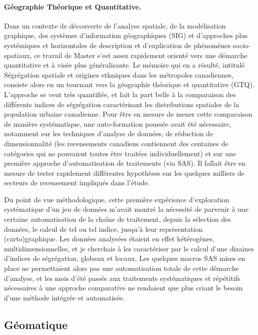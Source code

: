 \paragraph{Géographie Théorique et Quantitative.}

Dans un contexte de découverte de l'analyse spatiale, de la modélisation graphique, des systèmes d'information géographiques (SIG) et d'approches plus systémiques et horizontales de description et d'explication de phénomènes socio-spatiaux, ce travail de Master s'est assez rapidement orienté vers une démarche quantitative et à visée plus généralisante.
Le mémoire qui en a résulté, intitulé \og Ségrégation spatiale et origines ethniques dans les métropoles canadiennes\fg{}, consiste alors en un tournant vers la géographie théorique et quantitative (GTQ).
L'approche se veut très quantifiée, et fait la part belle à la comparaison des différents indices de ségrégation caractérisant les distributions spatiales de la population urbaine canadienne.
Pour être en mesure de mener cette comparaison de manière systématique, une auto-formation poussée avait été nécessaire, notamment sur les techniques d'analyse de données, de réduction de dimensionnalité (les recensements canadiens contiennent des centaines de catégories qui ne pouvaient toutes être traitées individuellement) et sur une première approche d'automatisation de traitements (via SAS).
Il fallait être en mesure de tester rapidement différentes hypothèses sur les quelques milliers de \og secteurs de recensement\fg{} impliqués dans l'étude.

Du point de vue méthodologique, cette première expérience d'exploration systématique d'un jeu de données m'avait montré la nécessité de parvenir à une certaine automatisation de la chaîne de traitement, depuis la sélection des données, le calcul de tel ou tel indice, jusqu'à leur représentation (carto)graphique.
Les données analysées étaient en effet hétérogènes, multidimensionnelles, et je cherchais à les caractériser par le calcul d'une dizaines d'indices de ségrégation, globaux et locaux.
Les quelques macros SAS mises en place ne permettaient alors pas une automatisation totale de cette démarche d'analyse, et les mois d'été passés aux traitements systématiques et répétitifs nécessaires à une approche comparative ne rendaient que plus criant le besoin d'une méthode intégrée et automatisée.

\subsection{Géomatique}

